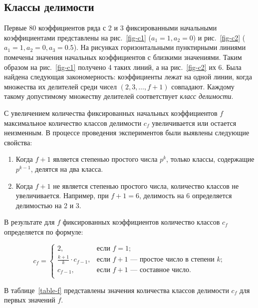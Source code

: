 \documentclass[intlimits,twoside,a4paper,11pt]{article}
\begin{document}
        \subsection{Классы делимости}

        Первые 80 коэффициентов ряда с 2 и 3 фиксированными начальными коэффициентами представлены на рис.~\ref{fig-c1} ($a_1=1, a_2=0$) 
        и рис.~\ref{fig-c2} ($a_1=1, a_2=0, a_3=0.5$). На рисунках горизонтальными пунктирными линиями помечены значения начальных коэффициентов
        с близкими значениями. Таким образом на рис.~\ref{fig-c1} получено 4 таких линий, а на рис.~\ref{fig-c2} их 6. 
        Была найдена следующая закономерность: коэффициенты лежат на одной линии, когда множества их делителей среди
        чисел $(2, 3, \dots, f+1)$ совпадают. Каждому такому допустимому множеству делителей соответствует \textit{класс делимости}.

        С увеличением количества фиксированных начальных коэффициентов $f$ максимальное количество классов делимости $c_f$ увеличивается или остается неизменным.
        В процессе проведения экспериментов были выявлены следующие свойства:
        \begin{enumerate}
            \item Когда $f+1$ является степенью простого числа $p^k$, только классы, содержащие $p^{k-1}$, делятся на два класса.
            \item Когда $f+1$ не является степенью простого числа, количество классов не увеличивается. 
            Например, при $f+1=6$, делимость на 6 определяется делимостью на 2 и 3.
        \end{enumerate}
        В результате для $f$ фиксированных коэффициентов количество классов $c_f$ определяется по формуле:

    \begin{equation}
        c_f=
        \begin{cases}
            2, & \mbox{если } f=1; \\
            \frac{k+1}{k}\cdot c_{f-1}, & \mbox{если }f+1\mbox{ --- простое число в степени }k; \\
            c_{f-1}, & \mbox{если }f+1\mbox{ --- составное число}.\\
        \end{cases}
    \end{equation}

    В таблице~\ref{table-f} представлены значения количества классов делимости $c_f$ для первых значений $f$. 
\end{document}
